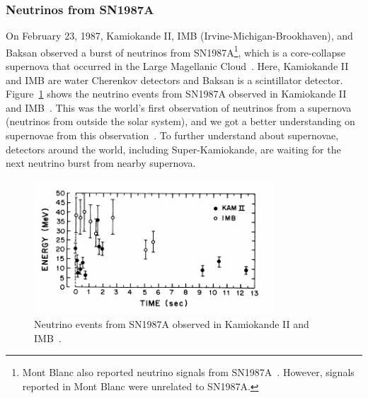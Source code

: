 \subsubsection{Neutrinos from SN1987A}\label{Subsubsec_SN1987A}
\vs\hs
On February 23, 1987, Kamiokande II, IMB (Irvine-Michigan-Brookhaven), and Baksan observed a burst of neutrinos from SN1987A\footnote{Mont Blanc also reported neutrino signals from SN1987A~\cite{1990Bethe}. However, signals reported in Mont Blanc were unrelated to SN1987A.}, which is a core-collapse supernova that occurred in the Large Magellanic Cloud~\cite{1987Hirata,1987Bionta,1987Alekseev}.
Here, Kamiokande II and IMB are water Cherenkov detectors and Baksan is a scintillator detector.
Figure~\ref{Introd_KamIMB} shows the neutrino events from SN1987A observed in Kamiokande II and IMB~\cite{1988Hirata}.
This was the world's first observation of neutrinos from a supernova (neutrinos from outside the solar system), and we got a better understanding on supernovae from this observation~\cite{1990Bethe}.
To further understand about supernovae, detectors around the world, including Super-Kamiokande, are waiting for the next neutrino burst from nearby supernova.

\begin{figure}[H]
	\centering
	\includegraphics[width=9cm]{Figures/Introduction/KamIMB}
	\caption[Neutrino events from SN1987A observed in Kamiokande II and IMB]{
	Neutrino events from SN1987A observed in Kamiokande II and IMB~\cite{1988Hirata}.
	}\label{Introd_KamIMB}
\end{figure}

